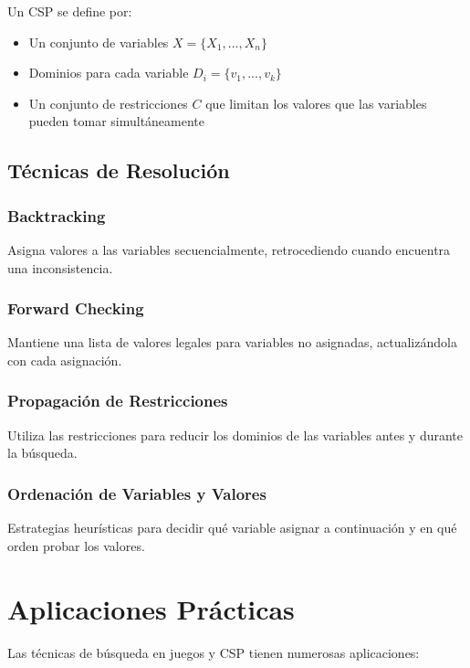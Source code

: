 \documentclass[12pt,a4paper]{report}
\begin{document}
	Un CSP se define por:
	\begin{itemize}
		\item Un conjunto de variables $X = \{X_1, ..., X_n\}$
		\item Dominios para cada variable $D_i = \{v_1, ..., v_k\}$
		\item Un conjunto de restricciones $C$ que limitan los valores que las variables pueden tomar simultáneamente
	\end{itemize}
	
	\subsection{Técnicas de Resolución}
	
	\subsubsection{Backtracking}
	
	Asigna valores a las variables secuencialmente, retrocediendo cuando encuentra una inconsistencia.
	
	\subsubsection{Forward Checking}
	
	Mantiene una lista de valores legales para variables no asignadas, actualizándola con cada asignación.
	
	\subsubsection{Propagación de Restricciones}
	
	Utiliza las restricciones para reducir los dominios de las variables antes y durante la búsqueda.
	
	\subsubsection{Ordenación de Variables y Valores}
	
	Estrategias heurísticas para decidir qué variable asignar a continuación y en qué orden probar los valores.
	
	\section{Aplicaciones Prácticas}
	
	Las técnicas de búsqueda en juegos y CSP tienen numerosas aplicaciones:
	
\end{document}
